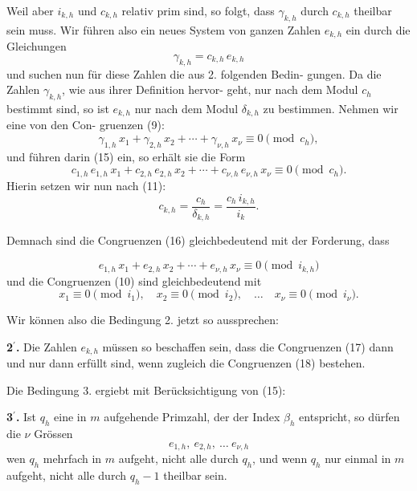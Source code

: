 \documentclass[12pt,a4paper]{article}
\begin{document}
Weil aber $i_{k,h}$ und $c_{k,h}$ relativ prim sind, so folgt, dass $\gamma_{k,h}$
durch $c_{k,h}$ theilbar sein muss. Wir f\"uhren also ein neues System
von ganzen Zahlen $e_{k,h}$ ein durch die Gleichungen
\begin{equation}\label{eq:k21-15}
\gamma_{k,h} = c_{k,h}\, e_{k,h}
\end{equation}
und suchen nun f\"ur diese Zahlen die aus 2. folgenden Bedin-
gungen. Da die Zahlen $\gamma_{k,h}$, wie aus ihrer Definition hervor-
geht, nur nach dem Modul $c_h$ bestimmt sind, so ist $e_{k,h}$ nur nach
dem Modul $\delta_{k,h}$ zu bestimmen. Nehmen wir eine von den Con-
gruenzen (9):
\[\gamma_{1,h}\, x_1 + \gamma_{2,h}\, x_2 + \cdots + \gamma_{\nu,h}\, x_\nu \equiv 0 \pmod{c_h},\]
und f\"uhren darin (15) ein, so erh\"alt sie die Form
\begin{equation}\label{eq:k21-16}
c_{1,h}\, e_{1,h}\, x_1 + c_{2,h}\, e_{2,h}\, x_2 + \cdots + c_{\nu,h}\, e_{\nu,h}\, x_\nu \equiv 0 \pmod{c_h}.
\end{equation}
Hierin setzen wir nun nach (11):
\[c_{k,h} = \frac{c_h}{\delta_{k,h}} = \frac{c_h\, i_{k,h}}{i_k}.\]

Demnach sind die Congruenzen (16) gleichbedeutend mit
der Forderung, dass

\begin{equation}\label{eq:k21-17}
e_{1,h}\, x_1 + e_{2,h}\, x_2 + \cdots + e_{\nu,h}\, x_\nu \equiv 0 \pmod{i_{k,h}}
\end{equation}
und die Congruenzen (10) sind gleichbedeutend mit
\begin{equation}\label{eq:k21-18}
x_1 \equiv 0 \pmod{i_1},\quad x_2 \equiv 0 \pmod{i_2},\quad \ldots\quad x_\nu \equiv 0 \pmod{i_\nu}.
\end{equation}

Wir k\"onnen also die Bedingung 2. jetzt so aussprechen:

\medskip
\noindent\textbf{2$^\prime$.} Die Zahlen $e_{k,h}$ m\"ussen so beschaffen sein, dass
die Congruenzen (17) dann und nur dann erf\"ullt sind, wenn
zugleich die Congruenzen (18) bestehen.

\medskip
Die Bedingung 3. ergiebt mit Ber\"ucksichtigung von (15):

\medskip
\noindent\textbf{3$^\prime$.} Ist $q_h$ eine in $m$ aufgehende Primzahl, der der
Index $\beta_h$ entspricht, so d\"urfen die $\nu$ Gr\"ossen
\[e_{1,h},\ e_{2,h},\ \ldots\ e_{\nu,h}\]
wen $q_h$ mehrfach in $m$ aufgeht, nicht alle durch $q_h$, und
wenn $q_h$ nur einmal in $m$ aufgeht, nicht alle durch $q_h - 1$
theilbar sein.
\end{document}
